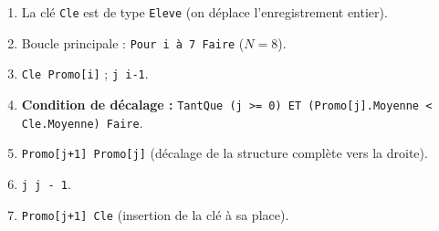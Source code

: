 \documentclass[11pt]{article}
\begin{document}
\begin{methode}
\begin{enumerate}
    \item La clé \texttt{Cle} est de type \texttt{Eleve} (on déplace l'enregistrement entier).
    \item Boucle principale : \texttt{Pour i  \`a 7 Faire} ($N=8$).
    \item \texttt{Cle \textleftarrow Promo[i]} ; \texttt{j \textleftarrow i-1}.
    \item \textbf{Condition de décalage :} \texttt{TantQue (j >= 0) ET (Promo[j].Moyenne < Cle.Moyenne) Faire}.
    \item \quad \texttt{Promo[j+1] \textleftarrow Promo[j]} (décalage de la structure complète vers la droite).
    \item \quad \texttt{j \textleftarrow j - 1}.
    \item \texttt{Promo[j+1] \textleftarrow Cle} (insertion de la clé à sa place).
\end{enumerate}
\end{methode}
\end{document}
